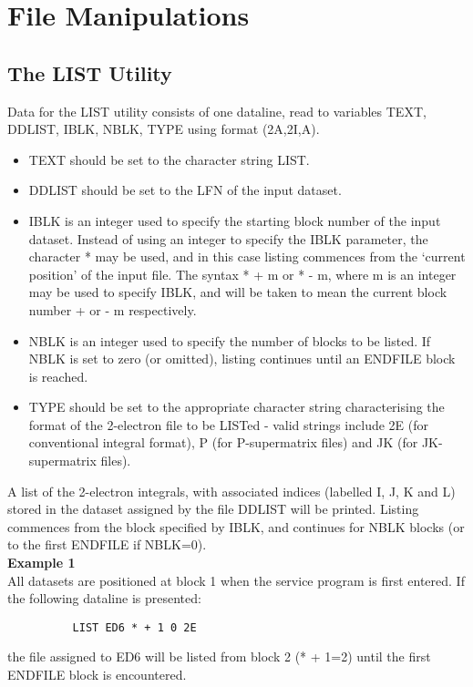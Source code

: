 \documentclass[11pt,fleqn]{article}
\begin{document}
\section{File Manipulations}

\subsection{The LIST Utility}

Data for the LIST utility consists of one dataline, read to variables
TEXT, DDLIST, IBLK, NBLK, TYPE using format (2A,2I,A).
\begin{itemize}
\item TEXT should be set to the character string LIST.
\item DDLIST should be set to the LFN of the input dataset.
\item IBLK is an integer used to specify the starting block number of
the input dataset. Instead of using an integer to specify
the IBLK parameter, the character * may be used, and in
this case listing commences from the `current position' of
the input file. The syntax * + m or * - m, where m is an
integer may be used to specify IBLK, and will be taken to
mean the current block number + or - m respectively.
\item  NBLK is an integer used to specify the number of blocks to be
listed. If NBLK is set to zero (or omitted), listing
continues until an ENDFILE block is reached.
\item TYPE should be set to the appropriate character string 
characterising the format of the 2-electron file to be LISTed - 
valid strings include 2E (for conventional integral format),
P (for P-supermatrix files) and JK (for JK-supermatrix files).
\end{itemize}
 
 A list of the 2-electron integrals, with associated indices (labelled
I, J, K and L) stored in the dataset assigned by the file DDLIST
will be printed. Listing commences from the block specified by IBLK,
and continues for NBLK blocks (or to the first ENDFILE if NBLK=0).\\

{\bf Example 1}\\

All datasets are positioned at block 1 when the service program is
first entered. If the following dataline is presented:

{
\footnotesize
\begin{verbatim}
          LIST ED6 * + 1 0 2E
\end{verbatim}
}
the file assigned to ED6 will be listed from block 2 (* + 1=2)
until the first ENDFILE block is encountered.
\end{document}
